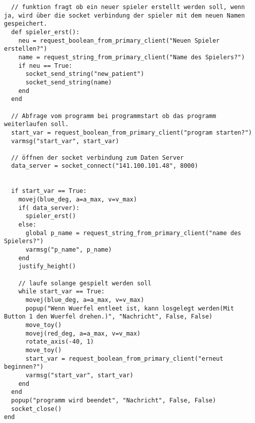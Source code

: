 \documentclass[
a4paper,
12pt,
oneside,
headsepline,		%
footsepline,		%
]{scrbook}
\begin{document}
\begin{lstlisting}
  // funktion fragt ob ein neuer spieler erstellt werden soll, wenn ja, wird über die socket verbindung der spieler mit dem neuen Namen gespeichert.
  def spieler_erst():
    neu = request_boolean_from_primary_client("Neuen Spieler erstellen?")
    name = request_string_from_primary_client("Name des Spielers?")
    if neu == True:
      socket_send_string("new_patient")
      socket_send_string(name)
    end
  end

  // Abfrage vom programm bei programmstart ob das programm weiterlaufen soll.
  start_var = request_boolean_from_primary_client("program starten?")
  varmsg("start_var", start_var)

  // öffnen der socket verbindung zum Daten Server
  data_server = socket_connect("141.100.101.48", 8000)
  
  
  if start_var == True:
    movej(blue_deg, a=a_max, v=v_max)
    if( data_server):
      spieler_erst()
    else:
      global p_name = request_string_from_primary_client("name des Spielers?")
      varmsg("p_name", p_name)
    end
    justify_height()

    // laufe solange gespielt werden soll
    while start_var == True:
      movej(blue_deg, a=a_max, v=v_max)
      popup("Wenn Wuerfel entleet ist, kann losgelegt werden(Mit Button 1 den Wuerfel drehen.)", "Nachricht", False, False)
      move_toy()
      movej(red_deg, a=a_max, v=v_max)
      rotate_axis(-40, 1)
      move_toy()
      start_var = request_boolean_from_primary_client("erneut beginnen?")
      varmsg("start_var", start_var)
    end
  end
  popup("programm wird beendet", "Nachricht", False, False)
  socket_close()
end
\end{lstlisting}
\end{document}
